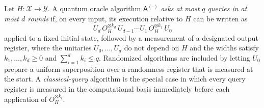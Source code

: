 \documentclass{aicr-conjecture}
\begin{document}
\begin{definition}\label{def:rounds}
Let $H \colon \mathcal{X} \to \mathcal{Y}$. A quantum oracle algorithm
$\mathsf{A}^{(\cdot)}$ \emph{asks at most $q$ queries in at most $d$ rounds}
if, on every input, its execution relative to $H$ can be written as
\[
  U_{d}\, O_H^{\otimes k_{d}}\, U_{d-1} \cdots U_{1}\,
  O_H^{\otimes k_{1}}\, U_{0}
\]
applied to a fixed initial state, followed by a measurement of a designated
output register, where the unitaries $U_0, \dots, U_{d}$ do not depend on
$H$ and the widths satisfy $k_1, \dots, k_{d} \ge 0$ and
$\sum_{i=1}^{d} k_i \le q$. Randomized algorithms are included by letting
$U_0$ prepare a uniform superposition over a randomness register that is
measured at the start. A \emph{classical-query} algorithm is the special
case in which every query register is measured in the computational basis
immediately before each application of $O_H^{\otimes k_i}$.
\end{definition}
\end{document}
